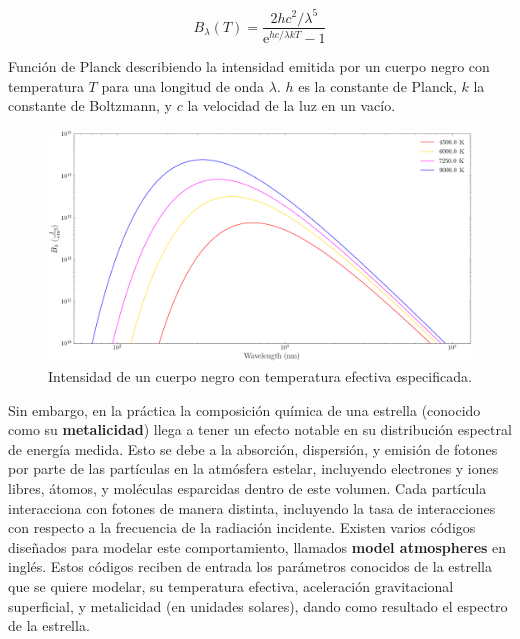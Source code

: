 \begin{eqfloat}
	\centering
	\begin{equation}
		B_\lambda (T) = \frac{2hc^2 / \lambda^5}{\mathrm{e}^{hc/\lambda kT} - 1}
	\end{equation}
	\caption{Función de Planck describiendo la intensidad emitida por un cuerpo
	negro con temperatura $T$ para una longitud de onda $\lambda$. $h$ es la
	constante de Planck, $k$ la constante de Boltzmann, y $c$ la velocidad de la
	luz en un vacío.}
	\label{blackbodyPlanckEquation}
\end{eqfloat}

\begin{figure}[!ht]
	\centering
	\includegraphics[scale=0.4]{Introduccion/Figures/Figura Cuerpo Negro Espectro.png}
	\caption{Intensidad de un cuerpo negro con temperatura efectiva especificada.}
	\label{figuraCuerpoNegroEspectro}
\end{figure}

Sin embargo, en la práctica la composición química de una estrella (conocido
como su \textbf{metalicidad}) llega a tener un efecto notable en su distribución
espectral de energía medida. Esto se debe a la absorción, dispersión, y emisión
de fotones por parte de las partículas en la atmósfera estelar, incluyendo
electrones y iones libres, átomos, y moléculas esparcidas dentro de este
volumen. Cada partícula interacciona con fotones de manera distinta, incluyendo
la tasa de interacciones con respecto a la frecuencia de la radiación incidente.
Existen varios códigos diseñados para modelar este comportamiento, llamados
\textbf{model atmospheres} en inglés. Estos códigos reciben de entrada los
parámetros conocidos de la estrella que se quiere modelar, su temperatura
efectiva, aceleración gravitacional superficial, y metalicidad (en unidades
solares), dando como resultado el espectro de la estrella.

